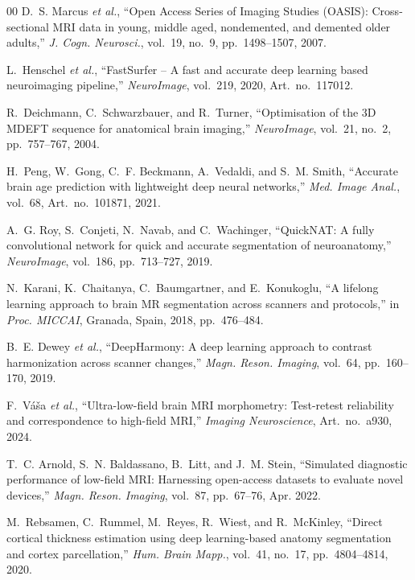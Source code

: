 \documentclass[12pt,a4paper]{article}
\begin{document}
\begin{thebibliography}{00}
D.~S. Marcus \emph{et al.},
``Open Access Series of Imaging Studies (OASIS): Cross-sectional MRI
data in young, middle aged, nondemented, and demented older adults,''
\emph{J. Cogn. Neurosci.}, vol.~19, no.~9, pp.~1498--1507, 2007.

L.~Henschel \emph{et al.},
``FastSurfer -- A fast and accurate deep learning based neuroimaging
pipeline,''
\emph{NeuroImage}, vol.~219, 2020, Art.~no.~117012.

R.~Deichmann, C.~Schwarzbauer, and R.~Turner,
``Optimisation of the 3D MDEFT sequence for anatomical brain imaging,''
\emph{NeuroImage}, vol.~21, no.~2, pp.~757--767, 2004.

H.~Peng, W.~Gong, C.~F. Beckmann, A.~Vedaldi, and S.~M. Smith,
``Accurate brain age prediction with lightweight deep neural networks,''
\emph{Med. Image Anal.}, vol.~68, Art.~no.~101871, 2021.

A.~G. Roy, S.~Conjeti, N.~Navab, and C.~Wachinger,
``QuickNAT: A fully convolutional network for quick and accurate
segmentation of neuroanatomy,''
\emph{NeuroImage}, vol.~186, pp.~713--727, 2019.

N.~Karani, K.~Chaitanya, C.~Baumgartner, and E.~Konukoglu,
``A lifelong learning approach to brain MR segmentation across scanners
and protocols,''
in \emph{Proc. MICCAI}, Granada, Spain, 2018, pp.~476--484.

B.~E. Dewey \emph{et al.},
``DeepHarmony: A deep learning approach to contrast harmonization across
scanner changes,''
\emph{Magn. Reson. Imaging}, vol.~64, pp.~160--170, 2019.

F.~V{\'a}{\v s}a \emph{et al.},
``Ultra-low-field brain MRI morphometry: Test-retest reliability and
correspondence to high-field MRI,''
\emph{Imaging Neuroscience}, Art.~no.~a930, 2024.

T.~C. Arnold, S.~N. Baldassano, B.~Litt, and J.~M. Stein,
``Simulated diagnostic performance of low-field MRI: Harnessing
open-access datasets to evaluate novel devices,''
\emph{Magn. Reson. Imaging}, vol.~87, pp.~67--76, Apr. 2022.

M.~Rebsamen, C.~Rummel, M.~Reyes, R.~Wiest, and R.~McKinley,
``Direct cortical thickness estimation using deep learning-based anatomy
segmentation and cortex parcellation,''
\emph{Hum. Brain Mapp.}, vol.~41, no.~17, pp.~4804--4814, 2020.


\end{thebibliography}
\end{document}
